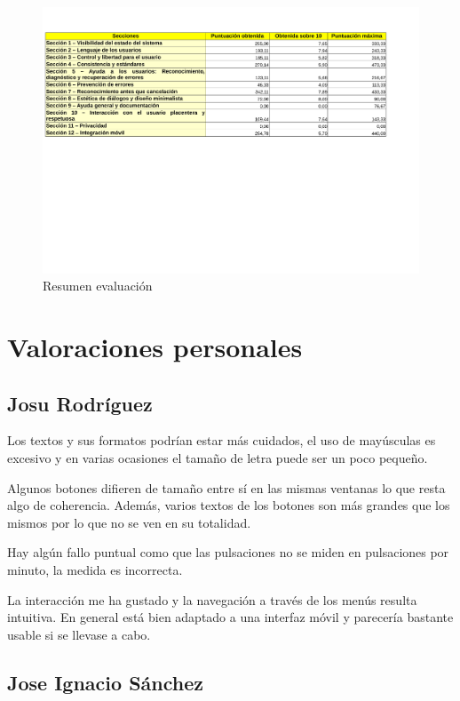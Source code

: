 \documentclass[a4paper]{article}
\begin{document}
\begin{figure}[!h]
\centering
\includegraphics[width=0.9\textheight,angle=90,clip=true,trim=0 10cm 0 0]{./figuras/resultados.pdf}
\caption{Resumen evaluación}
\end{figure}
\FloatBarrier

\section{Valoraciones personales}

\subsection{Josu Rodríguez}

Los textos y sus formatos podrían estar más cuidados, el uso de mayúsculas es excesivo y en varias ocasiones el tamaño de letra puede ser un poco pequeño.

Algunos botones difieren de tamaño entre sí en las mismas ventanas lo que resta algo de coherencia. Además, varios textos de los botones son más grandes que los mismos por lo que no se ven en su totalidad.

Hay algún fallo puntual como que las pulsaciones no se miden en pulsaciones por minuto, la medida es incorrecta. 

La interacción me ha gustado y la navegación a través de los menús resulta intuitiva. En general está bien adaptado a una interfaz móvil y parecería bastante usable si se llevase a cabo.

\subsection{Jose Ignacio Sánchez}
\end{document}
